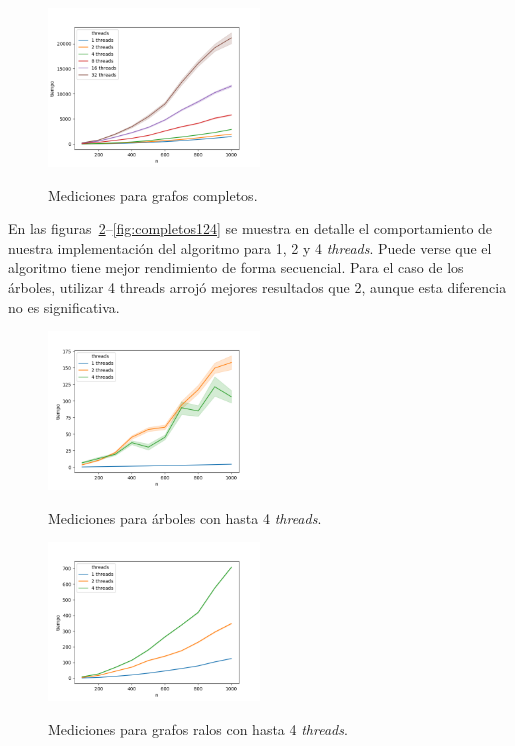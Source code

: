\begin{figure}[h]
\caption{Mediciones para grafos completos.}
\centering
\includegraphics[width=0.5\textwidth]{imagenes/completo.png} \\%
\label{fig:completos}
\end{figure}


En las figuras~\ref{fig:arboles124}--\ref{fig:completos124} se muestra en
detalle el comportamiento de nuestra implementación del algoritmo para 1, 2 y 4
\textit{threads}. Puede verse que el algoritmo tiene mejor rendimiento de forma
secuencial. Para el caso de los árboles, utilizar 4 threads arrojó
mejores resultados que 2, aunque esta diferencia no es significativa.

\begin{figure}[h]
\caption{Mediciones para árboles con hasta 4 \textit{threads}.}
\centering
\includegraphics[width=0.5\textwidth]{imagenes/arbol-124.png} \\%
\label{fig:arboles124}
\end{figure}

\begin{figure}[h]
\caption{Mediciones para grafos ralos con hasta 4 \textit{threads}.}
\centering
\includegraphics[width=0.5\textwidth]{imagenes/ralo-124.png} \\%
\label{fig:ralos124}
\end{figure}

